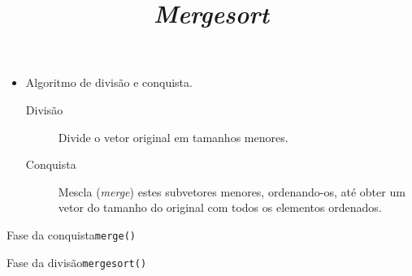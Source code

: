 \title{\it Mergesort}
\frame{\maketitle}

\begin{frame}{\inserttitle}
  \begin{itemize}
  \item Algoritmo de divisão e conquista.
    \begin{description}
    \item[Divisão] Divide o vetor original em tamanhos menores.
    \item[Conquista] Mescla ({\em merge}) estes subvetores menores,
      ordenando-os, até obter um vetor do tamanho do original com todos 
      os elementos ordenados.
    \end{description}
  \end{itemize}
\end{frame}

\begin{frame}[fragile]{Fase da conquista}{\tt merge()}
  
\end{frame}

\begin{frame}[fragile]{Fase da divisão}{\tt mergesort()}
  
\end{frame}

